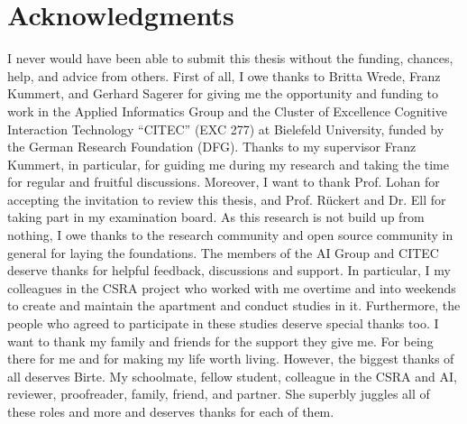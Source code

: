 

\chapter*{Acknowledgments}%
\thispagestyle{empty}

I never would have been able to submit this thesis without the funding, chances, help, and advice from others.
First of all, I owe thanks to Britta Wrede, Franz Kummert, and Gerhard Sagerer for giving me the opportunity and funding to work in the Applied Informatics Group and the Cluster of Excellence Cognitive Interaction Technology ``CITEC'' (EXC 277) at Bielefeld University, funded by the German Research Foundation (DFG).
Thanks to my supervisor Franz Kummert, in particular, for guiding me during my research and taking the time for regular and fruitful discussions.
Moreover, I want to thank Prof. Lohan for accepting the invitation to review this thesis, and Prof. Rückert and Dr. Ell for taking part in my examination board.
As this research is not build up from nothing, I owe thanks to the research community and open source community in general for laying the foundations.
The members of the AI Group and CITEC deserve thanks for helpful feedback, discussions and support.
In particular, I my colleagues in the CSRA project who worked with me overtime and into weekends to create and maintain the apartment and conduct studies in it.
Furthermore, the people who agreed to participate in these studies deserve special thanks too.
I want to thank my family and friends for the support they give me.
For being there for me and for making my life worth living.
However, the biggest thanks of all deserves Birte.
My schoolmate, fellow student, colleague in the CSRA and AI, reviewer, proofreader, family, friend, and partner.
She superbly juggles all of these roles and more and deserves thanks for each of them.

\cleardoublepage
